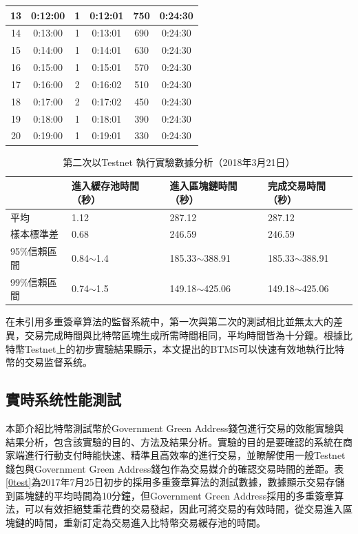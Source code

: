 \begin{enumerate}
\begin{table}[!htbp]
\begin{tabular}{|c|c|c|c|c|c|}
				13 & 0:12:00 & 1 & 0:12:01 & 750 & 0:24:30 \\ \hline
				14 & 0:13:00 & 1 & 0:13:01 & 690 & 0:24:30 \\ \hline
				15 & 0:14:00 & 1 & 0:14:01 & 630 & 0:24:30 \\ \hline
				16 & 0:15:00 & 1 & 0:15:01 & 570 & 0:24:30 \\ \hline
				17 & 0:16:00 & 2 & 0:16:02 & 510 & 0:24:30 \\ \hline
				18 & 0:17:00 & 2 & 0:17:02 & 450 & 0:24:30 \\ \hline
				19 & 0:18:00 & 1 & 0:18:01 & 390 & 0:24:30 \\ \hline
				20 & 0:19:00 & 1 & 0:19:01 & 330 & 0:24:30 \\ \hline
				\end{tabular}
				\end{table}

				\begin{table}[!htbp]
				\centering
				\caption{第二次以Testnet 執行實驗數據分析（2018年3月21日）}
				\label{2general-1}
				\begin{tabular}{|l|l|l|l|}
				\hline
				 & 進入緩存池時間（秒） & 進入區塊鏈時間（秒） & 完成交易時間（秒） \\ \hline
				平均 & 1.12 & 287.12 & 287.12 \\ \hline
				樣本標準差 & 0.68 & 246.59 & 246.59 \\ \hline
				95\%信賴區間 & 0.84$\sim$1.4 & 185.33$\sim$388.91 & 185.33$\sim$388.91 \\ \hline
				99\%信賴區間 & 0.74$\sim$1.5 & 149.18$\sim$425.06 & 149.18$\sim$425.06 \\ \hline
				\end{tabular}
				\end{table}


		\end{enumerate}

			在未引用多重簽章算法的監督系統中，第一次與第二次的測試相比並無太大的差異，交易完成時間與比特幣區塊生成所需時間相同，平均時間皆為十分鐘。根據比特幣Testnet上的初步實驗結果顯示，本文提出的BTMS可以快速有效地執行比特幣的交易监督系统。


		\subsection{實時系统性能測試}
		本節介紹比特幣測試幣於Government Green Address錢包進行交易的效能實驗與結果分析，包含該實驗的目的、方法及結果分析。實驗的目的是要確認的系統在商家端進行行動支付時能快速、精準且高效率的進行交易，並瞭解使用一般Testnet錢包與Government Green Address錢包作為交易媒介的確認交易時間的差距。表\ref{0test}為2017年7月25日初步的採用多重簽章算法的測試數據，數據顯示交易存儲到區塊鏈的平均時間為10分鐘，但Government Green Address採用的多重簽章算法，可以有效拒絕雙重花費的交易發起，因此可將交易的有效時間，從交易進入區塊鏈的時間，重新訂定為交易進入比特幣交易緩存池的時間。

